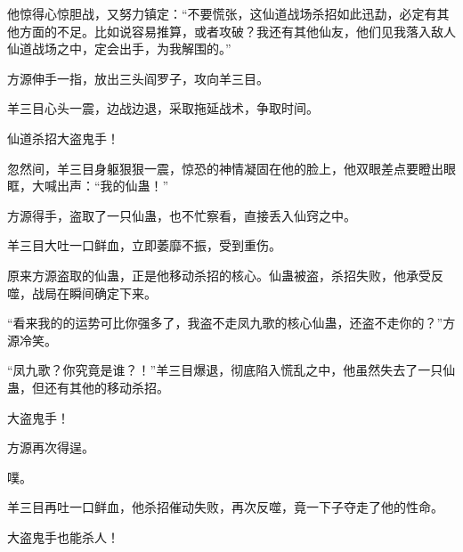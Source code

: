 \begin{this_body}
他惊得心惊胆战，又努力镇定：“不要慌张，这仙道战场杀招如此迅勐，必定有其他方面的不足。比如说容易推算，或者攻破？我还有其他仙友，他们见我落入敌人仙道战场之中，定会出手，为我解围的。”

方源伸手一指，放出三头阎罗子，攻向羊三目。

羊三目心头一震，边战边退，采取拖延战术，争取时间。

仙道杀招大盗鬼手！

忽然间，羊三目身躯狠狠一震，惊恐的神情凝固在他的脸上，他双眼差点要瞪出眼眶，大喊出声：“我的仙蛊！”

方源得手，盗取了一只仙蛊，也不忙察看，直接丢入仙窍之中。

羊三目大吐一口鲜血，立即萎靡不振，受到重伤。

原来方源盗取的仙蛊，正是他移动杀招的核心。仙蛊被盗，杀招失败，他承受反噬，战局在瞬间确定下来。

“看来我的的运势可比你强多了，我盗不走凤九歌的核心仙蛊，还盗不走你的？”方源冷笑。

“凤九歌？你究竟是谁？！”羊三目爆退，彻底陷入慌乱之中，他虽然失去了一只仙蛊，但还有其他的移动杀招。

大盗鬼手！

方源再次得逞。

噗。

羊三目再吐一口鲜血，他杀招催动失败，再次反噬，竟一下子夺走了他的性命。

大盗鬼手也能杀人！

\end{this_body}

